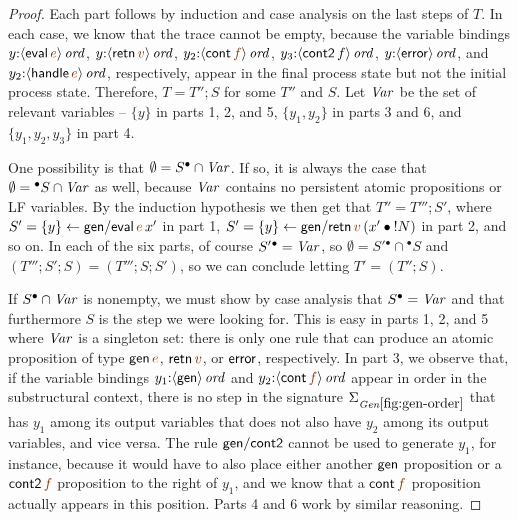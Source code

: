 \begin{proof}
  Each part follows by induction and case analysis on the last steps
  of $T$.  In each case, we know that the trace cannot be empty,
  because the variable bindings $y{:}\istrue{\susp{{\sf
        eval}\,\lf{e}}}$, $y{:}\istrue{\susp{{\sf retn}\,\lf{v}}}$,
  $y_2{:}\istrue{\susp{{\sf cont}\,\lf{f}}}$,
  $y_3{:}{\langle {{\sf cont2}\,f} \rangle}\,{{\it ord}}$, $y{:}{\langle {{\sf
        error}} \rangle}\,{{\it ord}}$, and $y_2{:}\istrue{\susp{{\sf handle}\,\lf{e}}}$,
  respectively, appear in the final process state but not the initial
  process state. Therefore, $T =
  T''; S$ for some $T''$ and $S$.  Let ${\it Var}$ be the set of relevant
  variables -- $\{y\}$ in parts 1, 2, and 5, $\{y_1, y_2\}$ in parts 3
  and 6, and $\{y_1,y_2,y_3\}$ in part 4. 

  One possibility is that $\emptyset = S^{\bullet} \cap {\it Var}$. If so, it
  is always the case that $\emptyset = {^{\bullet}S} \cap {\it Var}$ as well,
  because ${\it Var}$ contains no persistent atomic propositions or LF
  variables. By the induction hypothesis we then get that $T'' = T''';
  S'$, where $S' = \trstep{y}{{\sf gen/eval}\,\lf{e}\,x'}$ in part 1,
  $S' = \trstep{y}{{\sf gen/retn}\,\lf{v}\,(\tfuser{x'}{\tbangr{N}})}$
  in part 2, and so on.  In each of the six parts, of course
  $S'{^\bullet} = {\it Var}$, so $\emptyset = S'{^\bullet} \cap {^\bullet}S$
  and $\left(T'''; S'; S\right) = \left(T'''; S; S'\right)$, so we can
  conclude letting $T' = \left(T''; S\right)$.

  If $S^{\bullet} \cap {\it Var}$ is nonempty, we must show by case
  analysis that $S^{\bullet} = {\it Var}$ and that furthermore $S$ is
  the step we were looking for. This is easy in parts 1, 2, and 5
  where ${\it Var}$ is a singleton set: there is only one rule that
  can produce an atomic proposition of type ${\sf gen}\,\lf{e}$, ${\sf
    retn}\,\lf{v}$, or ${\sf error}$, respectively.  In part 3, we
  observe that, if the variable bindings $y_1{:}{\langle {{\sf
        gen}} \rangle}\,{{\it ord}}$ and $y_2{:}\istrue{\susp{{\sf cont}\,\lf{f}}}$ appear
  in order in the substructural context, there is no step in the
  signature $\siggenorder$ that has $y_1$ among its output variables
  that does not also have $y_2$ among its output variables, and vice
  versa. The rule ${\sf gen/cont2}$ cannot be used to generate $y_1$,
  for instance, because it would have to also place either another
  ${\sf gen}$ proposition or a ${\sf cont2}\,{\lf f}$ proposition to
  the right of $y_1$, and we know that a ${\sf cont}\,{\lf f}$
  proposition actually appears in this position. Parts 4 and 6 work
  by similar reasoning.
\end{proof}

